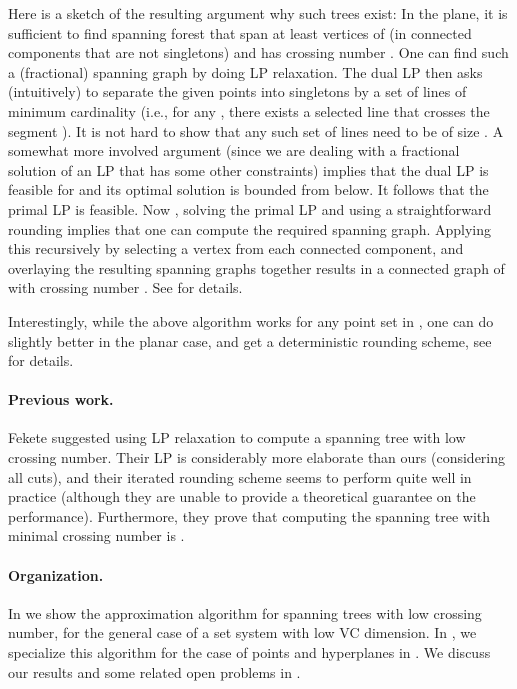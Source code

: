 \documentclass[12pt]{article}
\newcommand{\Term}[1]{\textsf{#1}}
\newcommand{\LP}{\Term{L{}P}\xspace}
\newcommand{\VC}{\Term{V{C}}\xspace}
\begin{document}
Here is a sketch of the resulting argument why such trees exist: In
the plane, it is sufficient to find spanning forest that span at least
 vertices of  (in connected components that are
not singletons) and has crossing number .  One can find such a
(fractional) spanning graph by doing \LP relaxation. The dual \LP then
asks (intuitively) to separate the given  points into singletons by
a set of lines of minimum cardinality (i.e., for any , there exists a selected line that crosses the segment
). It is not hard to show that any such set of lines need
to be of size . A somewhat more involved argument
(since we are dealing with a fractional solution of an \LP that has
some other constraints) implies that the dual \LP is feasible for  and its optimal solution is bounded from below. It follows
that the primal \LP is feasible. Now
, solving the primal \LP and using
a straightforward rounding implies that one can compute the required
spanning graph. Applying this recursively by selecting a vertex from
each connected component, and overlaying the resulting spanning graphs
together results in a connected graph of  with crossing
number .  See  for details.

Interestingly, while the above algorithm works for any point set in
, one can do slightly better in the planar case, and get a
deterministic rounding scheme, see  for details.



\medskip

\paragraph{Previous work.} Fekete \etal \cite{flm-msnmt-08} suggested
using \LP relaxation to compute a spanning tree with low crossing
number. Their \LP is considerably more elaborate than ours
(considering all cuts), and their iterated rounding scheme seems to
perform quite well in practice (although they are unable to provide a
theoretical guarantee on the performance). Furthermore, they prove
that computing the spanning tree with minimal crossing number is
\NPHard.

\paragraph{Organization.}
In  we show the  approximation
algorithm for spanning trees with low crossing number, for the general
case of a set system with low \VC dimension.  In , we
specialize this algorithm for the case of points and hyperplanes in
.  We discuss our results and some related open problems in
.
\end{document}
